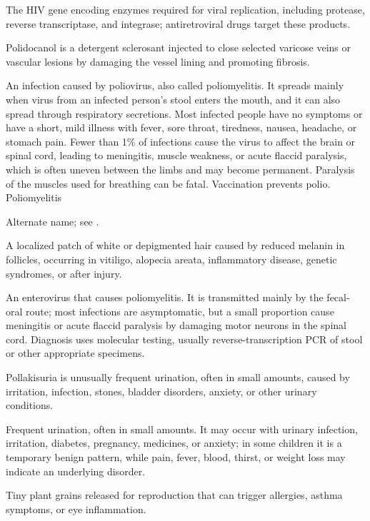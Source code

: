  The HIV gene encoding enzymes required for viral replication, including protease, reverse transcriptase, and integrase; antiretroviral drugs target these products.

 Polidocanol is a detergent sclerosant injected to close selected varicose veins or vascular lesions by damaging the vessel lining and promoting fibrosis.

 An infection caused by poliovirus, also called poliomyelitis. It spreads mainly when virus from an infected person’s stool enters the mouth, and it can also spread through respiratory secretions. Most infected people have no symptoms or have a short, mild illness with fever, sore throat, tiredness, nausea, headache, or stomach pain. Fewer than 1\% of infections cause the virus to affect the brain or spinal cord, leading to meningitis, muscle weakness, or acute flaccid paralysis, which is often uneven between the limbs and may become permanent. Paralysis of the muscles used for breathing can be fatal. Vaccination prevents polio.
\synonyms
Poliomyelitis

 Alternate name; see .

 A localized patch of white or depigmented hair caused by reduced melanin in follicles, occurring in vitiligo, alopecia areata, inflammatory disease, genetic syndromes, or after injury.

 An enterovirus that causes poliomyelitis. It is transmitted mainly by the fecal-oral route; most infections are asymptomatic, but a small proportion cause meningitis or acute flaccid paralysis by damaging motor neurons in the spinal cord. Diagnosis uses molecular testing, usually reverse-transcription PCR of stool or other appropriate specimens.

 Pollakisuria is unusually frequent urination, often in small amounts, caused by irritation, infection, stones, bladder disorders, anxiety, or other urinary conditions.

 Frequent urination, often in small amounts. It may occur with urinary infection, irritation, diabetes, pregnancy, medicines, or anxiety; in some children it is a temporary benign pattern, while pain, fever, blood, thirst, or weight loss may indicate an underlying disorder.

 Tiny plant grains released for reproduction that can trigger allergies, asthma symptoms, or eye inflammation.

